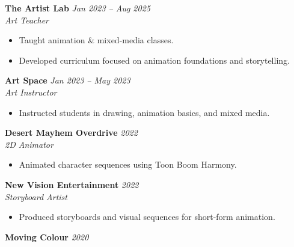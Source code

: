 \documentclass[11pt,letterpaper]{article}
\begin{document}
\textbf{The Artist Lab} \hfill \textit{Jan 2023 -- Aug 2025}\\

\textit{Art Teacher}

\begin{itemize}

    \item Taught animation & mixed-media classes.

    \item Developed curriculum focused on animation foundations and storytelling.

\end{itemize}



\textbf{Art Space} \hfill \textit{Jan 2023 -- May 2023}\\

\textit{Art Instructor}

\begin{itemize}

    \item Instructed students in drawing, animation basics, and mixed media.

\end{itemize}



\textbf{Desert Mayhem Overdrive} \hfill \textit{2022}\\

\textit{2D Animator}

\begin{itemize}

    \item Animated character sequences using Toon Boom Harmony.

\end{itemize}



\textbf{New Vision Entertainment} \hfill \textit{2022}\\

\textit{Storyboard Artist}

\begin{itemize}

    \item Produced storyboards and visual sequences for short-form animation.

\end{itemize}



\textbf{Moving Colour} \hfill \textit{2020}\\
\end{document}
